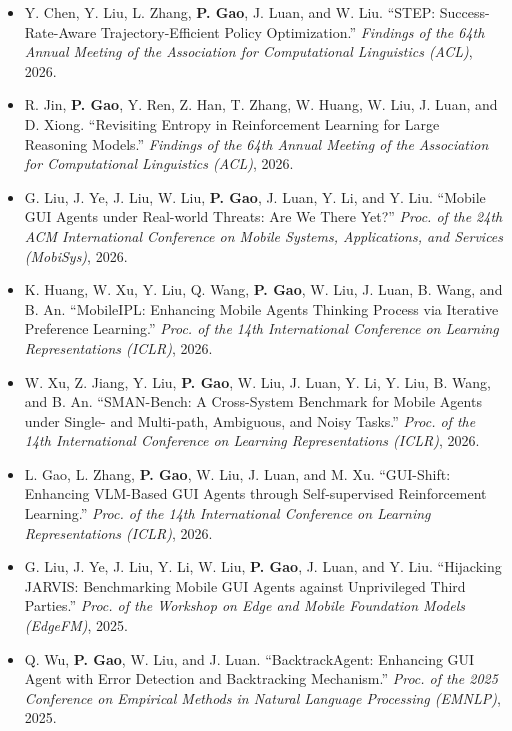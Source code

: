 \documentclass{resume}
\begin{document}
\begin{itemize}[parsep=0.2ex]
\item {Y. Chen, Y. Liu, L. Zhang, {\bf P. Gao}, J. Luan, and W. Liu. ``STEP: Success-Rate-Aware Trajectory-Efficient Policy Optimization.'' \emph{Findings of the 64th Annual Meeting of the Association for Computational Linguistics (ACL)}, 2026.}

\item {R. Jin, {\bf P. Gao}, Y. Ren, Z. Han, T. Zhang, W. Huang, W. Liu, J. Luan, and D. Xiong. ``Revisiting Entropy in Reinforcement Learning for Large Reasoning Models.'' \emph{Findings of the 64th Annual Meeting of the Association for Computational Linguistics (ACL)}, 2026.}

\item {G. Liu, J. Ye, J. Liu, W. Liu, {\bf P. Gao}, J. Luan, Y. Li, and Y. Liu. ``Mobile GUI Agents under Real-world Threats: Are We There Yet?'' \emph{Proc. of the 24th ACM International Conference on Mobile Systems, Applications, and Services (MobiSys)}, 2026.}

\item {K. Huang, W. Xu, Y. Liu, Q. Wang, {\bf P. Gao}, W. Liu, J. Luan, B. Wang, and B. An. ``MobileIPL: Enhancing Mobile Agents Thinking Process via Iterative Preference Learning.'' \emph{Proc. of the 14th International Conference on Learning Representations (ICLR)}, 2026.}

\item {W. Xu, Z. Jiang, Y. Liu, {\bf P. Gao}, W. Liu, J. Luan, Y. Li, Y. Liu, B. Wang, and B. An. ``SMAN-Bench: A Cross-System Benchmark for Mobile Agents under Single- and Multi-path, Ambiguous, and Noisy Tasks.'' \emph{Proc. of the 14th International Conference on Learning Representations (ICLR)}, 2026.}

\item {L. Gao, L. Zhang, {\bf P. Gao}, W. Liu, J. Luan, and M. Xu. ``GUI-Shift: Enhancing VLM-Based GUI Agents through Self-supervised Reinforcement Learning.'' \emph{Proc. of the 14th International Conference on Learning Representations (ICLR)}, 2026.}

\item {G. Liu, J. Ye, J. Liu, Y. Li, W. Liu, {\bf P. Gao}, J. Luan, and Y. Liu. ``Hijacking JARVIS: Benchmarking Mobile GUI Agents against Unprivileged Third Parties.'' \emph{Proc. of the Workshop on Edge and Mobile Foundation Models (EdgeFM)}, 2025.}

\item {Q. Wu, {\bf P. Gao}, W. Liu, and J. Luan. ``BacktrackAgent: Enhancing GUI Agent with Error Detection and Backtracking Mechanism.'' \emph{Proc. of the 2025 Conference on Empirical Methods in Natural Language Processing (EMNLP)}, 2025.}


\end{itemize}
\end{document}
